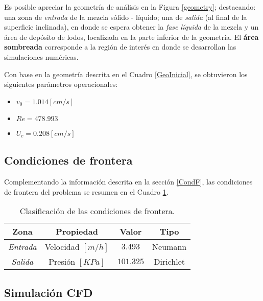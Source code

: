 \noindent
\justify

Es posible apreciar la geometr\'ia de an\'alisis en la Figura \ref{geometry}; destacando: una zona de \textit{entrada} de la mezcla s\'olido - l\'iquido; una de \textit{salida} (al final de la superficie inclinada), en donde se espera obtener la \textit{fase l\'iquida} de la mezcla y un \'area de dep\'osito de lodos, localizada en la parte inferior de la geometr\'ia. El \textbf{\'area sombreada} corresponde a la regi\'on de inter\'es en donde se desarrollan las simulaciones num\'ericas.



\noindent
\justify

Con base en la geometr\'ia descrita en el Cuadro \ref{GeoInicial}, se obtuvieron los siguientes par\'ametros operacionales:

\begin{itemize}
	\item $v_0 = 1.014 [cm/s]$
	\item $Re = 478.993$
	\item $U_c = 0.208 [cm/s]$
\end{itemize}



\subsection{Condiciones de frontera}

\noindent
\justify

Complementando la informaci\'on descrita en la secci\'on \ref{CondF}, las condiciones de frontera del problema se resumen en el Cuadro \ref{condFr}.

\begin{table}[h!]
	\centering
	\begin{tabular}{|c|c|c|c|}
		\hline
		\textbf{Zona} & \textbf{Propiedad} & \textbf{Valor}  & \textbf{Tipo} \\ \hline
		\textit{Entrada} & Velocidad $[m/h]$ & $3.493$ & Neumann \\ \hline
		\textit{Salida} & Presi\'on $[KPa]$ & $101.325$ & Dirichlet \\ \hline
	\end{tabular}
	\caption{Clasificaci\'on de las condiciones de frontera.}
	\label{condFr}
\end{table}

\newpage

\subsection{Simulaci\'on CFD}


